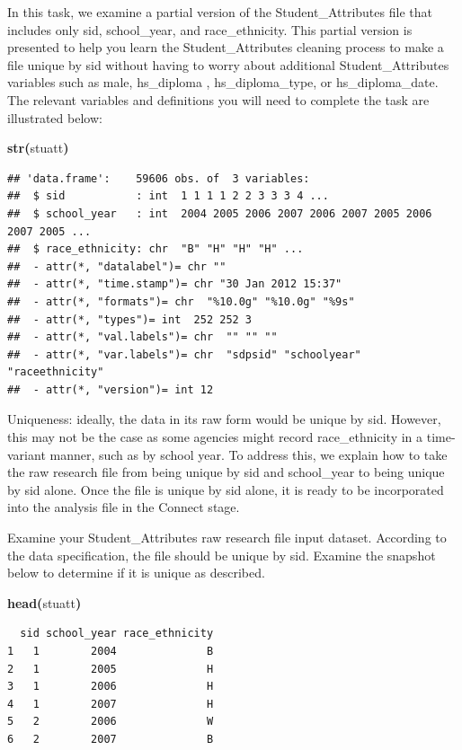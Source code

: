 \documentclass[12pt]{article}
\makeatletter
\newcommand{\hlfunctioncall}[1]{\textcolor[rgb]{0.501960784313725,0,0.329411764705882}{\textbf{#1}}}%
\newcommand{\hlkeyword}[1]{\textcolor[rgb]{0,0,0}{\textbf{#1}}}%
\newcommand{\hlsymbol}[1]{\textcolor[rgb]{0,0,0}{#1}}%
\newenvironment{kframe}{%
 \def\FrameCommand##1{\hskip\@totalleftmargin \hskip-\fboxsep
 \colorbox{shadecolor}{##1}\hskip-\fboxsep
     \hskip-\linewidth \hskip-\@totalleftmargin \hskip\columnwidth}%
 \MakeFramed {\advance\hsize-\width
   \@totalleftmargin\z@ \linewidth\hsize
   \@setminipage}}%
 {\par\unskip\endMakeFramed}
\newenvironment{knitrout}{}{} %
\makeatother
\begin{document}
In this task, we examine a partial version of the Student\_Attributes file that includes only sid, school\_year, and race\_ethnicity. This partial 
version is presented to help you learn the Student\_Attributes cleaning process to make a file unique by sid without having to 
worry about additional Student\_Attributes variables such as male, hs\_diploma , hs\_diploma\_type, or hs\_diploma\_date.  The 
relevant variables and definitions you will need to complete the task are illustrated below:

\begin{knitrout}
\color{fgcolor}\begin{kframe}
\begin{flushleft}
\ttfamily\noindent
\hlfunctioncall{str}\hlkeyword{(}\hlsymbol{stuatt}\hlkeyword{)}\mbox{}
\normalfont
\end{flushleft}
\begin{verbatim}
## 'data.frame':	59606 obs. of  3 variables:
##  $ sid           : int  1 1 1 1 2 2 3 3 3 4 ...
##  $ school_year   : int  2004 2005 2006 2007 2006 2007 2005 2006 2007 2005 ...
##  $ race_ethnicity: chr  "B" "H" "H" "H" ...
##  - attr(*, "datalabel")= chr ""
##  - attr(*, "time.stamp")= chr "30 Jan 2012 15:37"
##  - attr(*, "formats")= chr  "%10.0g" "%10.0g" "%9s"
##  - attr(*, "types")= int  252 252 3
##  - attr(*, "val.labels")= chr  "" "" ""
##  - attr(*, "var.labels")= chr  "sdpsid" "schoolyear" "raceethnicity"
##  - attr(*, "version")= int 12
\end{verbatim}
\end{kframe}
\end{knitrout}


Uniqueness: ideally, the data in its raw form would be unique by sid.  However, this may not be the case as some agencies might 
record race\_ethnicity in a time-variant manner, such as by school year. To address this, we explain how to take the raw research 
file from being unique by sid and school\_year to being unique by sid alone.  Once the file is unique by sid alone, it is ready to be 
incorporated into the analysis file in the Connect stage.

Examine  your Student\_Attributes raw research file input dataset.  According to the data specification, the file should be 
unique by sid.  Examine the snapshot below to determine if it is unique as described.  

\begin{knitrout}
\color{fgcolor}\begin{kframe}
\begin{flushleft}
\ttfamily\noindent
\hlfunctioncall{head}\hlkeyword{(}\hlsymbol{stuatt}\hlkeyword{)}\mbox{}
\normalfont
\end{flushleft}
\begin{verbatim}
  sid school_year race_ethnicity
1   1        2004              B
2   1        2005              H
3   1        2006              H
4   1        2007              H
5   2        2006              W
6   2        2007              B
\end{verbatim}
\end{kframe}
\end{knitrout}
\end{document}
